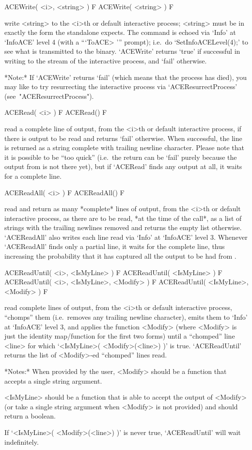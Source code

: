 \>ACEWrite( <i>, <string> ) F
\>ACEWrite( <string> ) F

write <string> to the <i>th or  default  interactive  {\ACE}  process;
<string> must be in exactly the form the  {\ACE}  standalone  expects.
The command is  echoed  via  `Info'  at  `InfoACE'  level  4  (with  a
```ToACE> ''' prompt); i.e.~do `SetInfoACELevel(4);' to  see  what  is
transmitted  to  the  {\ACE}  binary.  `ACEWrite'  returns  `true'  if
successful in writing to the stream of the interactive {\ACE} process,
and `fail' otherwise.

*Note:*
If `ACEWrite' returns `fail' (which means that the {\ACE} process  has
died), you may like to try resurrecting the interactive {\ACE} process
via `ACEResurrectProcess' (see~"ACEResurrectProcess").

\>ACERead( <i> ) F
\>ACERead() F

read a complete line of {\ACE}  output,  from  the  <i>th  or  default
interactive {\ACE} process, if there is output to be read and  returns
`fail' otherwise. When successful, the line is returned  as  a  string
complete with trailing newline  character.  Please  note  that  it  is
possible to be ``too quick'' (i.e.~the return  can  be  `fail'  purely
because the output from {\ACE} is not there  yet),  but  if  `ACERead'
finds any output at all, it waits for a complete line.

\>ACEReadAll( <i> ) F
\>ACEReadAll() F

read and return as many *complete* lines of {\ACE}  output,  from  the
<i>th or default interactive {\ACE} process, as there are to be  read,
*at the time of the call*, as a list  of  strings  with  the  trailing
newlines removed and returns the empty  list  otherwise.  `ACEReadAll'
also writes each line read via `Info' at `InfoACE' level  3.  Whenever
`ACEReadAll' finds only a partial line,  it  waits  for  the  complete
line, thus increasing the probability that it  has  captured  all  the
output to be had from {\ACE}.

\>ACEReadUntil( <i>, <IsMyLine> ) F
\>ACEReadUntil( <IsMyLine> ) F
\>ACEReadUntil( <i>, <IsMyLine>, <Modify> ) F
\>ACEReadUntil( <IsMyLine>, <Modify> ) F

read complete lines of  {\ACE}  output,  from  the  <i>th  or  default
interactive {\ACE} process, ``chomps'' them (i.e.~removes any trailing
newline character), emits them to `Info' at  `InfoACE'  level  3,  and
applies the function <Modify> (where <Modify>  is  just  the  identity
map/function for the first two forms) until a ``chomped'' line  <line>
for which `<IsMyLine>( <Modify>(<line>)  )'  is  true.  `ACEReadUntil'
returns the list of <Modify>-ed ``chomped'' lines read.

*Notes:* 
When provided by the user, <Modify> should be a function that  accepts
a single string argument.

<IsMyLine> should be a function that is able to accept the  output  of
<Modify> (or take a  single  string  argument  when  <Modify>  is  not
provided) and should return a boolean.

If `<IsMyLine>( <Modify>(<line>) )' is never true, `ACEReadUntil' will
wait indefinitely.

